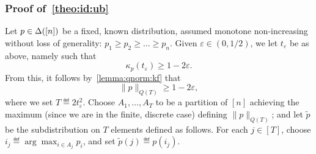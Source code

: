 \documentclass[11pt]{article}
\theoremstyle{remark}   	\newtheorem{remark}[theorem]{Remark}
\theoremstyle{definition}   	\newaliascnt{defn}{theorem}
\newcommand{\eps}{\ensuremath{\varepsilon}\xspace}
\newcommand{\norm}[1]{\lVert#1{\rVert}}
\newcommand{\kf}[1]{\kappa_{#1}}
\begin{document}
\subsubsection{Proof of~\autoref{theo:id:ub}}

Let $p\in\Delta\!\left([n]\right)$ be a fixed, known distribution, assumed monotone non-increasing without loss of generality: $p_1\geq p_2\geq\dots\geq p_n$. Given $\eps \in (0,1/2)$, we let $t_\eps$ be as above, namely such that
\[
    \kf{p}(t_\eps) \geq 1-2\eps.
\]
From this, it follows by~\autoref{lemma:qnorm:kf} that
\begin{equation}\label{eq:ub:qt:norm}
    \norm{p}_{Q(T)} \geq 1-2\eps,
\end{equation}
where we set $T\eqdef 2t^2_\eps$. Choose $A_1,\dots,A_T$ to be a partition of $[n]$ achieving the maximum (since we are in the finite, discrete case) defining $\norm{p}_{Q(T)}$; and let $\tilde{p}$ be the subdistribution on $T$ elements defined as follows.
For each $j\in[T]$, choose $i_j \eqdef \arg\max_{i\in A_j} p_i$, and set $\tilde{p}(j) \eqdef p(i_j)$.
\end{document}
